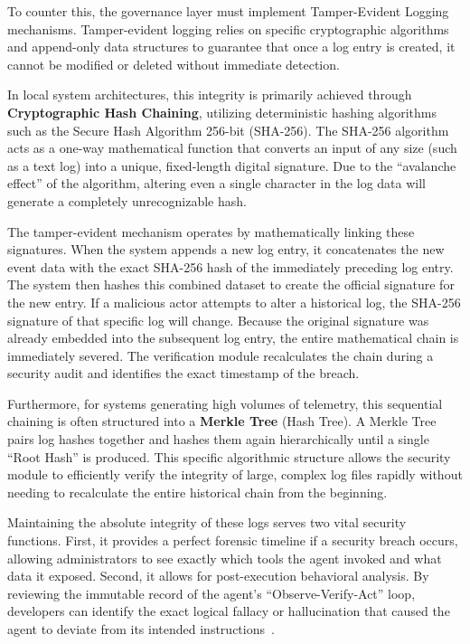 \documentclass[a4paper]{report}
\begin{document}
To counter this, the governance layer must implement Tamper-Evident Logging mechanisms. Tamper-evident logging relies on specific cryptographic algorithms and append-only data structures to guarantee that once a log entry is created, it cannot be modified or deleted without immediate detection.

In local system architectures, this integrity is primarily achieved through \textbf{Cryptographic Hash Chaining}, utilizing deterministic hashing algorithms such as the Secure Hash Algorithm 256-bit (SHA-256). The SHA-256 algorithm acts as a one-way mathematical function that converts an input of any size (such as a text log) into a unique, fixed-length digital signature. Due to the ``avalanche effect'' of the algorithm, altering even a single character in the log data will generate a completely unrecognizable hash.

The tamper-evident mechanism operates by mathematically linking these signatures. When the system appends a new log entry, it concatenates the new event data with the exact SHA-256 hash of the immediately preceding log entry. The system then hashes this combined dataset to create the official signature for the new entry. If a malicious actor attempts to alter a historical log, the SHA-256 signature of that specific log will change. Because the original signature was already embedded into the subsequent log entry, the entire mathematical chain is immediately severed. The verification module recalculates the chain during a security audit and identifies the exact timestamp of the breach.

Furthermore, for systems generating high volumes of telemetry, this sequential chaining is often structured into a \textbf{Merkle Tree} (Hash Tree). A Merkle Tree pairs log hashes together and hashes them again hierarchically until a single ``Root Hash'' is produced. This specific algorithmic structure allows the security module to efficiently verify the integrity of large, complex log files rapidly without needing to recalculate the entire historical chain from the beginning.

Maintaining the absolute integrity of these logs serves two vital security functions. First, it provides a perfect forensic timeline if a security breach occurs, allowing administrators to see exactly which tools the agent invoked and what data it exposed. Second, it allows for post-execution behavioral analysis. By reviewing the immutable record of the agent's ``Observe-Verify-Act'' loop, developers can identify the exact logical fallacy or hallucination that caused the agent to deviate from its intended instructions~\cite{sharma2025agentic, sharma2025policy}.
\end{document}
